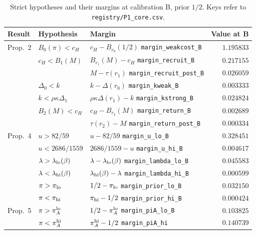 \documentclass[11pt]{article}
\theoremstyle{definition}
\begin{document}
\begin{table}[h]
\centering
\caption{Strict hypotheses and their margins at calibration B, prior $1/2$. Keys refer to
\texttt{registry/P1\_core.csv}.}\label{tab:margins}
\small
\begin{tabular}{@{}lllr@{}}
\toprule
Result & Hypothesis & Margin & Value at B\\
\midrule
Prop.~2 & $B_0(\pi)<c_H$ & $c_H-B_{r_0}(1/2)$ \hfill\texttt{margin\_weakcost\_B} & $1.195833$\\
 & $c_H<B_1(M)$ & $B_{r_1}(M)-c_H$ \hfill\texttt{margin\_recruit\_B} & $0.217155$\\
 & & $M-\tau(r_1)$ \hfill\texttt{margin\_recruit\_post\_B} & $0.026059$\\
 & $\Delta_0<k$ & $k-\Delta(r_0)$ \hfill\texttt{margin\_kweak\_B} & $0.003333$\\
 & $k<\rho\kappa\Delta_1$ & $\rho\kappa\Delta(r_1)-k$ \hfill\texttt{margin\_kstrong\_B} & $0.024824$\\
 & $B_2(M)<c_H$ & $c_H-B_{r_2}(M)$ \hfill\texttt{margin\_return\_B} & $0.002689$\\
 & & $\tau(r_2)-M$ \hfill\texttt{margin\_return\_post\_B} & $0.000334$\\
\midrule
Prop.~4 & $u>82/59$ & $u-82/59$ \hfill\texttt{margin\_u\_lo\_B} & $0.328451$\\
 & $u<2686/1559$ & $2686/1559-u$ \hfill\texttt{margin\_u\_hi\_B} & $0.004617$\\
 & $\lambda>\lambda_{\rm lo}(\beta)$ & $\lambda-\lambda_{\rm lo}(\beta)$ \hfill\texttt{margin\_lambda\_lo\_B} & $0.045583$\\
 & $\lambda<\lambda_{\rm hi}(\beta)$ & $\lambda_{\rm hi}(\beta)-\lambda$ \hfill\texttt{margin\_lambda\_hi\_B} & $0.000599$\\
 & $\pi>\pi_{\rm lo}$ & $1/2-\pi_{\rm lo}$ \hfill\texttt{margin\_prior\_lo\_B} & $0.032150$\\
 & $\pi<\pi_{\rm hi}$ & $\pi_{\rm hi}-1/2$ \hfill\texttt{margin\_prior\_hi\_B} & $0.000424$\\
\midrule
Prop.~5 & $\pi>\pi_A^{\rm lo}$ & $1/2-\pi_A^{\rm lo}$ \hfill\texttt{margin\_piA\_lo\_B} & $0.103825$\\
 & $\pi<\pi_A^{\rm hi}$ & $\pi_A^{\rm hi}-1/2$ \hfill\texttt{margin\_piA\_hi} & $0.140739$\\
\bottomrule
\end{tabular}
\end{table}
\end{document}

